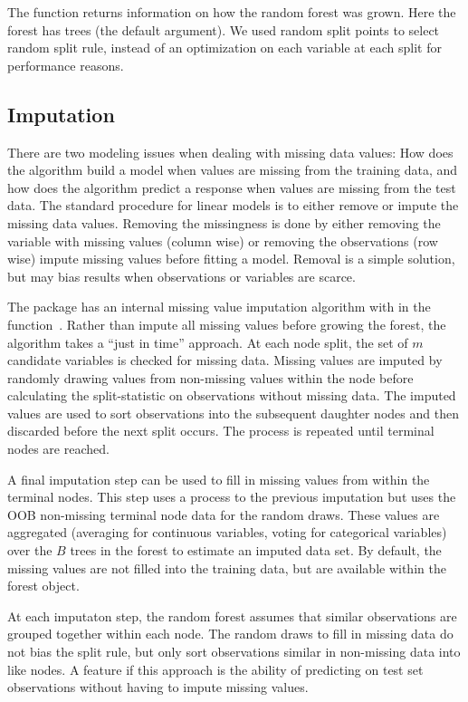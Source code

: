 \documentclass[nojss]{jss}\usepackage[]{graphicx}\usepackage[]{color}
\begin{document}
The  function returns information on how the random forest was grown. Here the  forest has  trees (the default  argument). We used  random split points to select random split rule, instead of an optimization on each variable at each split for performance reasons. 

\subsection{Imputation}\label{S:imputation}

There are two modeling issues when dealing with missing data values: How does the algorithm build a model when values are missing from the training data, and how does the algorithm predict a response when values are missing from the test data. The standard procedure for linear models is to either remove or impute the missing data values. Removing the missingness is done by either removing the variable with missing values (column wise) or removing the observations (row wise) impute missing values before fitting a model. Removal is a simple solution, but may bias results when observations or variables are scarce. 

The  package has an internal missing value imputation algorithm with in the  function~\cite{Ishwaran:2008}. Rather than impute all missing values before growing the forest, the algorithm takes a ``just in time'' approach. At each node split, the set of $m$ candidate variables is checked for missing data. Missing values are imputed by randomly drawing values from non-missing values within the node before calculating the split-statistic on observations without missing data. The imputed values are used to sort observations into the subsequent daughter nodes and then discarded before the next split occurs. The process is repeated until terminal nodes are reached. 

A final imputation step can be used to fill in missing values from within the terminal nodes. This step uses a process to the previous imputation but uses the OOB non-missing terminal node data for the random draws. These values are aggregated (averaging for continuous variables, voting for categorical variables) over the $B$ trees in the forest to estimate an imputed data set. By default, the missing values are not filled into the training data, but are available within the forest object.

At each imputaton step, the random forest assumes that similar observations are grouped together within each node. The random draws to fill in missing data do not bias the split rule, but only sort observations similar in non-missing data into like nodes. A feature if this approach is the ability of predicting on test set observations without having to impute missing values. 
\end{document}

